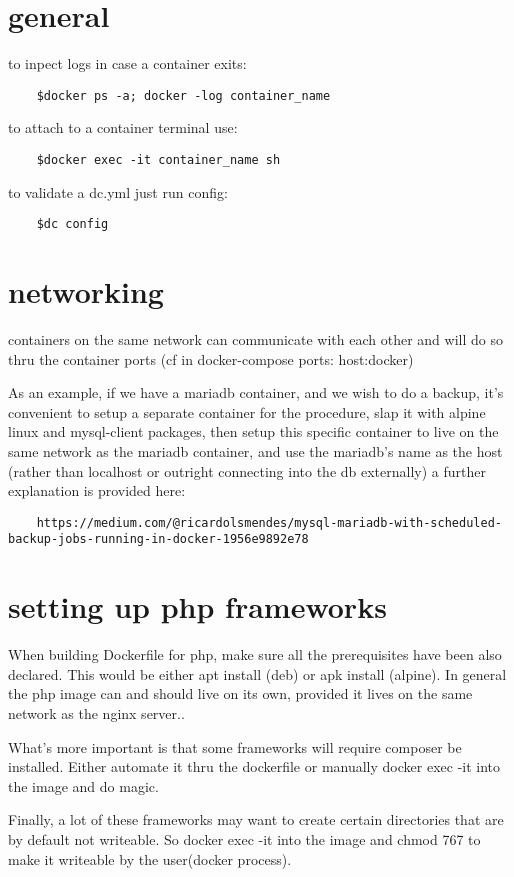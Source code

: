\section{general}%
\label{sec:general}

to inpect logs in case a container exits:
\begin{verbatim}
	$docker ps -a; docker -log container_name
\end{verbatim}

to attach to a container terminal use:
\begin{verbatim}
	$docker exec -it container_name sh
\end{verbatim}

to validate a dc.yml just run config:
\begin{verbatim}
	$dc config
\end{verbatim}

\section{networking}%
\label{sec:networking}

containers on the same network can communicate with each other and will do so thru the container ports (cf in docker-compose ports: host:docker)

As an example, if we have a mariadb container, and we wish to do a backup, it's convenient to setup a separate container for the procedure, slap it with alpine linux and mysql-client packages, then setup this specific container to live on the same network as the mariadb container, and use the mariadb's name as the host (rather than localhost or outright connecting into the db externally) a further explanation is provided here:
\begin{verbatim}
	https://medium.com/@ricardolsmendes/mysql-mariadb-with-scheduled-backup-jobs-running-in-docker-1956e9892e78
\end{verbatim}

\section{setting up php frameworks}%
\label{sec:setting_up_php_frameworks}

When building Dockerfile for php, make sure all the prerequisites have been also declared. This would be either apt install (deb) or apk install (alpine).
In general the php image can and should live on its own, provided it lives on the same network as the nginx server..

What's more important is that some frameworks will require composer be installed. Either automate it thru the dockerfile or manually docker exec -it into the image and do magic.

Finally, a lot of these frameworks may want to create certain directories that are by default not writeable. So docker exec -it into the image and chmod 767 to make it writeable by the user(docker process).

